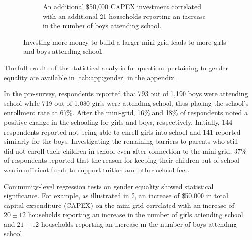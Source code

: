 \begin{figure}[b]
\begin{subfigure}[t]{0.48\textwidth}
		\caption{An additional \$50,000 CAPEX investment correlated with an additional 21 households reporting an increase in the number of boys attending school.}
		\label{fig:boys-school}
	\end{subfigure}
	\caption{Investing more money to build a larger mini-grid leads to more girls and boys attending school.}
	\label{fig:regression-schooling}
\end{figure}
The full results of the statistical analysis for questions pertaining to gender equality are available in \cref{tab:app:gender} in the appendix.

In the pre-survey, respondents reported that 793 out of 1,190 boys were attending school while 719 out of 1,080 girls were attending school, thus placing the school's enrollment rate at 67\%. After the mini-grid, 16\% and 18\% of respondents noted a positive change in the schooling for girls and boys, respectively. Initially, 144 respondents reported not being able to enroll girls into school and 141 reported similarly for the boys. Investigating the remaining barriers to parents who still did not enroll their children in school even after connection to the mini-grid, 37\% of respondents reported that the reason for keeping their children out of school was insufficient funds to support tuition and other school fees. 

Community-level regression tests on gender equality showed statistical significance. For example, as illustrated in \cref{fig:regression-schooling}, an increase of \$50,000 in total capital expenditure (CAPEX) on the mini-grid correlated with an increase of $20\pm12$ households reporting an increase in the number of girls attending school and $21\pm12$ households reporting an increase in the number of boys attending school.

